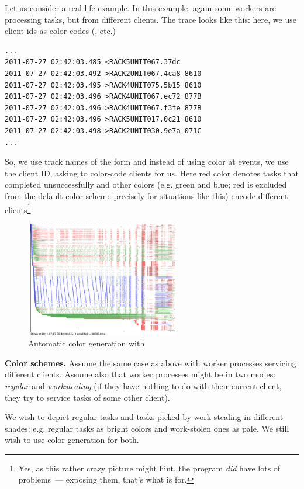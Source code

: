 \documentclass{article}
\begin{document}
Let us consider a real-life example. In this example, again some workers are processing tasks, but from different clients.
The trace looks like this: here, we use client ids as color codes (,  etc.)
\begin{verbatim}
...
2011-07-27 02:42:03.485 <RACK5UNIT067.37dc
2011-07-27 02:42:03.492 >RACK2UNIT067.4ca8 8610
2011-07-27 02:42:03.495 >RACK4UNIT075.5b15 8610
2011-07-27 02:42:03.496 >RACK4UNIT067.ec72 877B
2011-07-27 02:42:03.496 >RACK4UNIT067.f3fe 877B
2011-07-27 02:42:03.496 >RACK5UNIT017.0c21 8610
2011-07-27 02:42:03.498 >RACK2UNIT030.9e7a 071C
...
\end{verbatim}
So, we use track names of the form  and instead of using color at \hlverb{>} events, we use the client ID, asking \splot{} to color-code clients for us. Here red color denotes tasks that completed unsuccessfully and other colors (e.g. green and blue; red is excluded from the default color scheme precisely for situations like this) encode different clients\footnote{Yes, as this rather crazy picture might hint, the program \emph{did} have lots of problems~--- exposing them, that's what \splot{} is for.}.

\begin{figure}[h]
\center
\includegraphics[width=0.6\textwidth]{pics/splot/splot-color-gen.png}
\caption{Automatic color generation with \splot{}}
\label{fig:splot-color-gen}
\end{figure}

\textbf{Color schemes.} Assume the same case as above with worker processes servicing different clients. Assume also that worker processes might be in two modes: \emph{regular} and \emph{workstealing} (if they have nothing to do with their current client, they try to service tasks of some other client).

We wish to depict regular tasks and tasks picked by work-stealing in different shades: e.g. regular tasks as bright colors and work-stolen ones as pale. We still wish to use color generation for both. 
\end{document}
